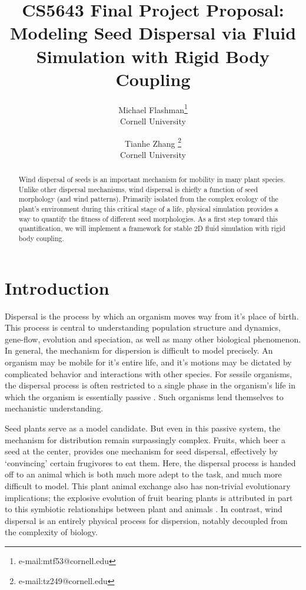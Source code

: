 \documentclass[annual]{acmsiggraph}
\title{CS5643 Final Project Proposal: \\ Modeling Seed Dispersal via Fluid Simulation with Rigid Body Coupling}
\author{Michael Flashman\thanks{e-mail:mtf53@cornell.edu}\\Cornell University \and Tianhe Zhang \thanks{e-mail:tz249@cornell.edu}\\Cornell University}
\begin{document}
\maketitle

\begin{abstract}
Wind dispersal of  seeds is an important mechanism for mobility in many plant species.  Unlike other dispersal mechanisms, wind dispersal is chiefly a function of seed morphology (and wind patterns).  Primarily isolated from the  complex ecology of the plant's environment during this critical stage of a life, physical simulation provides a way to  quantify the fitness of different seed morphologies.   As a first step toward this quantification, we will implement a  framework for stable 2D fluid simulation with rigid body coupling.
\end{abstract}

\keywordlist

\copyrightspace

\section{Introduction}


Dispersal is the process by which an organism moves way from it's place of birth.  This process is central to understanding  population structure and dynamics, gene-flow, evolution and speciation, as well as many other biological phenomenon\cite{levin1989}.   In general, the mechanism for dispersion is difficult to model precisely. An organism may be mobile for it's entire life, and it's motions may be dictated by complicated behavior and interactions with other species.  For sessile organisms, the dispersal process is often restricted to a single phase in the organism's life in which the organism is essentially passive \cite{nathan2000}.   Such organisms lend themselves to mechanistic understanding.  

Seed plants serve as a model candidate. But even in this passive system, the mechanism for distribution remain surpassingly complex.  Fruits, which beer a seed at the center, provides one mechanism for seed dispersal, effectively by `convincing' certain frugivores  to eat them. Here, the dispersal process is handed off to an animal which is both much more adept to the task, and much more difficult to model. This plant animal exchange also has non-trivial evolutionary implications; the explosive evolution of fruit bearing plants is  attributed in part to this symbiotic relationships between plant and animals \cite{lorts2008}.  In contrast, wind dispersal is an entirely physical process for dispersion, notably decoupled from the complexity of biology.    
\end{document}
